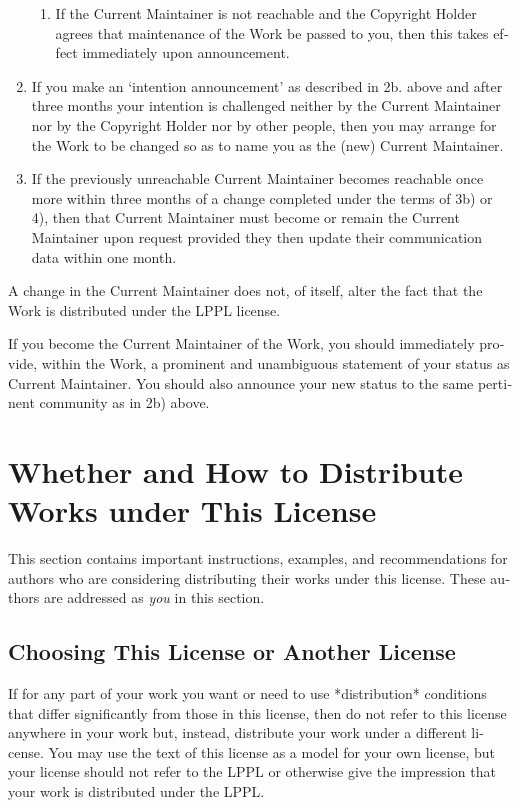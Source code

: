 \begin{otherlanguage}{english}
\begin{enumerate}
\begin{enumerate}
    \item If the Current Maintainer is not reachable and the Copyright
     Holder agrees that maintenance of the Work be passed to you,
     then this takes effect immediately upon announcement.
    \end{enumerate}
 \item  If you make an `intention announcement' as described in 2b. above
     and after three months your intention is challenged neither by
     the Current Maintainer nor by the Copyright Holder nor by other
     people, then you may arrange for the Work to be changed so as
     to name you as the (new) Current Maintainer.

 \item  If the previously unreachable Current Maintainer becomes
     reachable once more within three months of a change completed
     under the terms of 3b) or 4), then that Current Maintainer must
     become or remain the Current Maintainer upon request provided
     they then update their communication data within one month.
\end{enumerate}
A change in the Current Maintainer does not, of itself, alter the fact
that the Work is distributed under the LPPL license.

If you become the Current Maintainer of the Work, you should
immediately provide, within the Work, a prominent and unambiguous
statement of your status as Current Maintainer.  You should also
announce your new status to the same pertinent community as
in 2b) above.


\section{Whether and How to Distribute Works under This License}

This section contains important instructions, examples, and
recommendations for authors who are considering distributing their
works under this license.  These authors are addressed as \emph{you} in
this section.

\subsection{Choosing This License or Another License}

If for any part of your work you want or need to use *distribution*
conditions that differ significantly from those in this license, then
do not refer to this license anywhere in your work but, instead,
distribute your work under a different license.  You may use the text
of this license as a model for your own license, but your license
should not refer to the LPPL or otherwise give the impression that
your work is distributed under the LPPL.


\end{otherlanguage}
